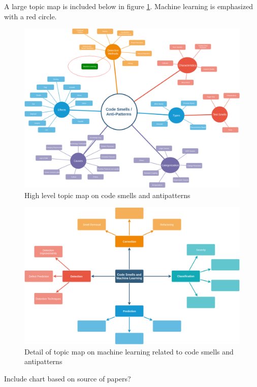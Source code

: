 \documentclass[conference]{IEEEtran}
\begin{document}
A large topic map is included below in figure \ref{fig:TM}.
Machine learning is emphasized with a red circle. 
\begin{figure}[ht]
  \centerline{\includegraphics[width=\linewidth]{AntiPattern-TopicMap.png}}
  \caption{High level topic map on code smells and antipatterns}
  \label{fig:TM}
\end{figure} 

\begin{figure}[!ht]
  \centerline{\includegraphics[width=\textwidth]{ML-codesmells.png}}
  \caption{Detail of topic map on machine learning related to code smells and antipatterns}
  \label{fig:ML}
\end{figure} 

Include chart based on source of papers?
\end{document}
